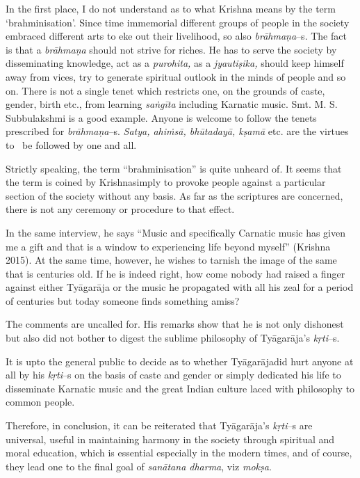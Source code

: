 In the first place, I do not understand as to what Krishna means by the term ‘brahminisation’. Since time immemorial different groups of people in the society embraced different arts to eke out their livelihood, so also \textit{brāhmaṇa}–s. The fact is that a \textit{brāhmaṇa} should not strive for riches. He has to serve the society by disseminating knowledge, act as a \textit{purohita,} as a \textit{jyautiṣika,} should keep himself away from vices, try to generate spiritual outlook in the minds of people and so on. There is not a single tenet which restricts one, on the grounds of caste, gender, birth etc., from learning \textit{saṅgīta} including Karnatic music. Smt. M. S. Subbulakshmi is a good example. Anyone is welcome to follow the tenets prescribed for \textit{brāhmaṇa}–s. \textit{Satya, ahiṁsā, bhūtadayā, kṣamā} etc. are the virtues to  be followed by one and all. 

Strictly speaking, the term “brahminisation” is quite unheard of. It seems that the term is coined by Krishnasimply to provoke people against a particular section of the society without any basis. As far as the scriptures are concerned, there is not any ceremony or procedure to that effect.

\newpage

In the same interview, he says “Music and specifically Carnatic music has given me a gift and that is a window to experiencing life beyond myself” (Krishna 2015). At the same time, however, he wishes to tarnish the image of the same that is centuries old. If he is indeed right, how come nobody had raised a finger against either Tyāgarāja or the music he propagated with all his zeal for a period of centuries but today someone finds something amiss? 

The comments are uncalled for. His remarks show that he is not only dishonest but also did not bother to digest the sublime philosophy of Tyāgarāja’s \textit{kṛti}–s. 

It is upto the general public to decide as to whether Tyāgarājadid hurt anyone at all by his \textit{kṛti}–s on the basis of caste and gender or simply dedicated his life to disseminate Karnatic music and the great Indian culture laced with philosophy to common people.

Therefore, in conclusion, it can be reiterated that Tyāgarāja’s \textit{kṛti}–s are universal, useful in maintaining harmony in the society through spiritual and moral education, which is essential especially in the modern times, and of course, they lead one to the final goal of \textit{sanātana dharma}, viz \textit{mokṣa}.


